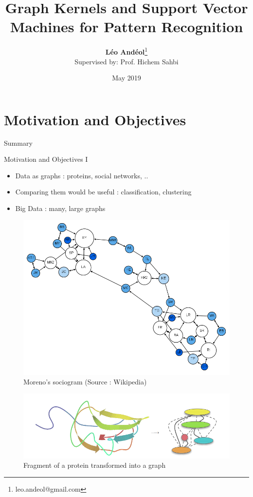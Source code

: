 \documentclass[compress]{beamer}
\title[Graph Kernels]{Graph Kernels and Support Vector Machines for Pattern Recognition}
\author[Léo Andéol]{\textbf{Léo Andéol}\thanks{leo.andeol@gmail.com}\\ \footnotesize Supervised by: Prof. Hichem Sahbi}
\institute[Sorbonne Uni.]{Master DAC - Sorbonne Université}
\date{May 2019}
\begin{document}
\begin{frame}
  \titlepage
\end{frame}

\section{Motivation and Objectives}
\begin{frame}{Summary}
  \tableofcontents[currentsection]
\end{frame}
\begin{frame}{Motivation and Objectives I}
\begin{multicols}{2}
	\begin{itemize}
		\item Data as graphs : proteins, social networks, ..
		\item Comparing them would be useful : classification, clustering
		\item Big Data : many, large graphs
	\end{itemize}
	\begin{figure}
		\includegraphics[height=.3\textheight]{data/sociogram.png}\par
		\caption*{\footnotesize Moreno's sociogram (Source : Wikipedia)}
	\end{figure}
\end{multicols}

\begin{figure}
	\centering
	\includegraphics[height=.15\textheight, width=\linewidth]{data/ecoli.png}
\caption*{Fragment of a protein transformed into a graph \citep{vishwanathan_graph_2010}}
\end{figure}

\end{frame}
\end{document}
